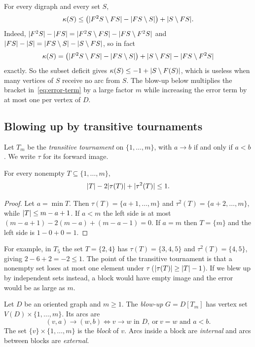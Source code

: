 \begin{remark}\label{rem:error-term}
For every digraph and every set $S$,
\begin{equation}\label{eq:error-term}
 \kappa(S)\le\bigl(\lvert F^2S\setminus FS\rvert-\lvert FS\setminus S\rvert\bigr)+\lvert S\setminus FS\rvert.
\end{equation}
Indeed, $\lvert F^2S\rvert-\lvert FS\rvert=\lvert F^2S\setminus FS\rvert-\lvert FS\setminus F^2S\rvert$ and
$\lvert FS\rvert-\lvert S\rvert=\lvert FS\setminus S\rvert-\lvert S\setminus FS\rvert$, so in fact
\[
 \kappa(S)=\bigl(\lvert F^2S\setminus FS\rvert-\lvert FS\setminus S\rvert\bigr)+\lvert S\setminus FS\rvert-\lvert FS\setminus F^2S\rvert
\]
exactly. So the subset deficit
gives $\kappa(S)\le -1+\lvert S\setminus F(S)\rvert$, which is useless when many
vertices of $S$ receive no arc from $S$. The blow-up below multiplies the
bracket in~\eqref{eq:error-term} by a large factor $m$ while increasing the
error term by at most one per vertex of $D$.
\end{remark}

\subsection{Blowing up by transitive tournaments}\label{sec:blowup}

Let $T_m$ be the \emph{transitive tournament} on $\{1,\dots,m\}$, with
$a\to b$ if and only if $a<b$. We write $\tau$ for its forward image.

\begin{lemma}\label{lem:internal}
For every nonempty $T\subseteq\{1,\dots,m\}$,
\[
 \lvert T\rvert-2\lvert \tau(T)\rvert+\lvert \tau^2(T)\rvert\le 1 .
\]
\end{lemma}

\begin{proof}
Let $a=\min T$. Then $\tau(T)=\{a+1,\dots,m\}$ and $\tau^2(T)=\{a+2,\dots,m\}$,
while $\lvert T\rvert\le m-a+1$. If $a<m$ the left side is at most
$(m-a+1)-2(m-a)+(m-a-1)=0$. If $a=m$ then $T=\{m\}$ and the left side is
$1-0+0=1$.
\end{proof}

For example, in $T_5$ the set $T=\{2,4\}$ has $\tau(T)=\{3,4,5\}$ and
$\tau^2(T)=\{4,5\}$, giving $2-6+2=-2\le1$. The point of the transitive
tournament is that a nonempty set loses at most one element under $\tau$
($\lvert \tau(T)\rvert\ge\lvert T\rvert-1$). If we blew up by independent sets instead, a block
would have empty image and the error would be as large as $m$.

\begin{definition}[Blow-up]
Let $D$ be an oriented graph and $m\ge1$. The \emph{blow-up} $G=D[T_m]$ has
vertex set $V(D)\times\{1,\dots,m\}$. Its arcs are
\[
 (v,a)\to(w,b)\iff v\to w\text{ in }D,\ \text{or}\ v=w\text{ and }a<b.
\]
The set $\{v\}\times\{1,\dots,m\}$ is the \emph{block} of $v$. Arcs inside a
block are \emph{internal} and arcs between blocks are \emph{external}.
\end{definition}

